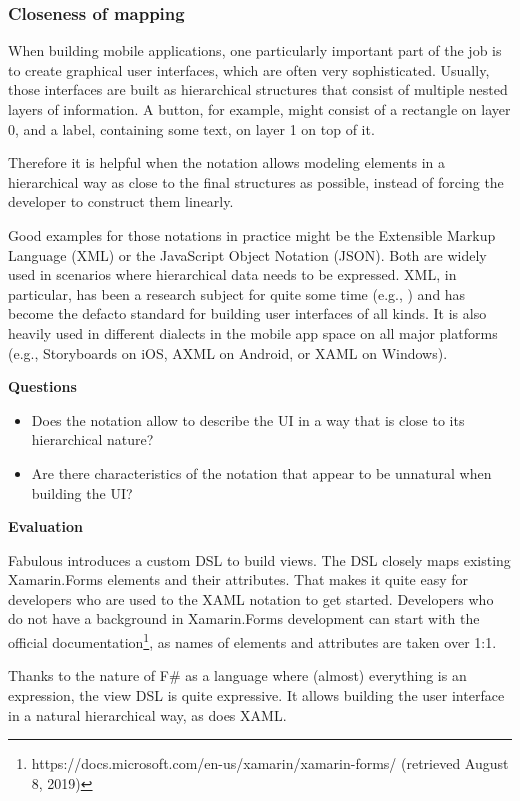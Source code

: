 \subsubsection{Closeness of mapping}

When building mobile applications, one particularly important part of the job is to create graphical user interfaces, which are often very sophisticated. Usually, those interfaces are built as hierarchical structures that consist of multiple nested layers of information. A button, for example, might consist of a rectangle on layer 0, and a label, containing some text, on layer 1 on top of it. 

Therefore it is helpful when the notation allows modeling elements in a hierarchical way as close to the final structures as possible, instead of forcing the developer to construct them linearly. 

Good examples for those notations in practice might be the Extensible Markup Language (XML) or the JavaScript Object Notation (JSON). Both are widely used in scenarios where hierarchical data needs to be expressed. XML, in particular, has been a research subject for quite some time (e.g., \cite{luyten_developing_2004}) and has become the defacto standard for building user interfaces of all kinds. It is also heavily used in different dialects in the mobile app space on all major platforms (e.g., Storyboards on iOS, AXML on Android, or XAML on Windows).

\textbf{Questions}

\begin{itemize}
\item Does the notation allow to describe the UI in a way that is close to its hierarchical nature?
\item Are there characteristics of the notation that appear to be unnatural when building the UI?
\end{itemize}

\textbf{Evaluation}

Fabulous introduces a custom DSL to build views. The DSL closely maps existing Xamarin.Forms elements and their attributes. That makes it quite easy for developers who are used to the XAML notation to get started. Developers who do not have a background in Xamarin.Forms development can start with the official documentation\footnote{https://docs.microsoft.com/en-us/xamarin/xamarin-forms/ (retrieved August 8, 2019)}, as names of elements and attributes are taken over 1:1.

Thanks to the nature of F\# as a language where (almost) everything is an expression, the view DSL is quite expressive. It allows building the user interface in a natural hierarchical way, as does XAML.

